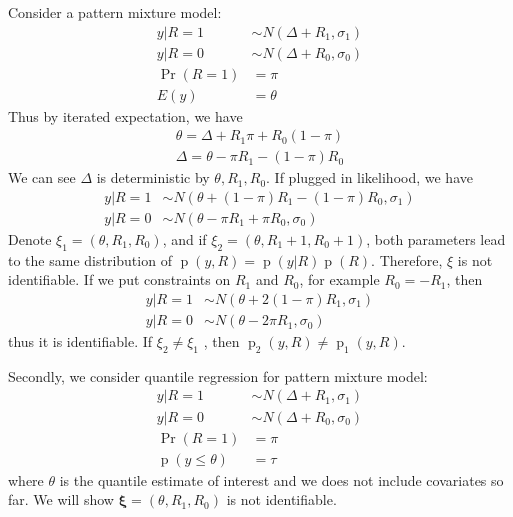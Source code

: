 \documentclass[12pt]{article}
\DeclareMathOperator{\pr}{p}
\DeclareMathOperator{\prob}{Pr}
\begin{document}
Consider a pattern mixture model:
\begin{align*}
  y | R = 1 & \sim N(\Delta + R_1 , \sigma_1) \\
  y | R = 0 & \sim N(\Delta + R_0, \sigma_0) \\
  \prob (R = 1) & = \pi \\
  E (y ) & = \theta
\end{align*}
Thus by iterated expectation, we have
\begin{align*}
  \theta = \Delta + R_1\pi + R_0(1-\pi) \\
  \Delta = \theta - \pi R_1 - (1 - \pi)R_0
\end{align*}
We can see $\Delta$ is deterministic by $\theta, R_1, R_0$. If plugged
in likelihood, we have
\begin{align*}
  y | R = 1 & \sim N(\theta + (1 - \pi)R_1 - (1 - \pi)R_0, \sigma_1) \\
  y | R = 0 & \sim N(\theta - \pi R_1 + \pi R_0, \sigma_0)
\end{align*}
Denote $\xi_1 = (\theta , R_1, R_0)$, and if $\xi_2 = (\theta, R_1+ 1,
R_0+1)$, both parameters lead to the same distribution of $\pr(y, R) =
\pr(y|R)\pr(R)$. Therefore, $\xi$ is not identifiable.  If we put
constraints on $R_1$ and $R_0$, for example $R_0 = -R_1$, then
\begin{align*}
  y | R = 1 & \sim N(\theta + 2(1 - \pi)R_1 , \sigma_1) \\
  y | R = 0 & \sim N(\theta - 2\pi R_1 , \sigma_0)
\end{align*}
thus it is identifiable. If $\xi_2 \neq \xi_1$ , then $\pr_2(y, R)
\neq \pr_1(y, R)$.

Secondly, we consider quantile regression for pattern mixture model:
\begin{align*}
  y | R = 1 & \sim N(\Delta + R_1 , \sigma_1) \\
  y | R = 0 & \sim N(\Delta + R_0, \sigma_0) \\
  \prob (R = 1) & = \pi \\
  \pr (y \leq \theta ) & = \tau
\end{align*}
where $\theta$ is the quantile estimate of interest and we does not
include covariates so far. We will show $\bm \xi = (\theta, R_1, R_0)
$ is not identifiable.
\end{document}
